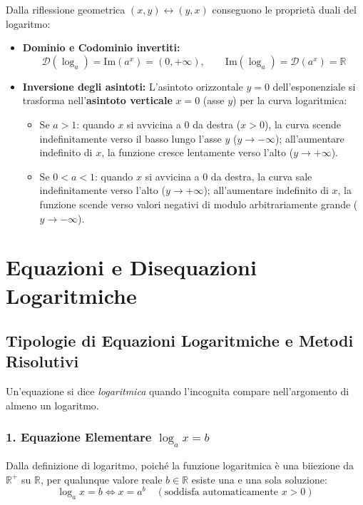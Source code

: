 \documentclass[11pt,a4paper,oneside]{report}
\begin{document}
Dalla riflessione geometrica $(x, y) \longleftrightarrow (y, x)$ conseguono le proprietà duali del logaritmo:
\begin{itemize}
    \item \textbf{Dominio e Codominio invertiti:}
    \begin{equation}
        \mathcal{D}(\log_a) = \mathrm{Im}(a^x) = (0, +\infty), \qquad \mathrm{Im}(\log_a) = \mathcal{D}(a^x) = \mathbb{R}
    \end{equation}
    \item \textbf{Inversione degli asintoti:} L'asintoto orizzontale $y = 0$ dell'esponenziale si trasforma nell'\textbf{asintoto verticale} $x = 0$ (asse $y$) per la curva logaritmica:
    \begin{itemize}
        \item Se $a > 1$: quando $x$ si avvicina a $0$ da destra ($x > 0$), la curva scende indefinitamente verso il basso lungo l'asse $y$ ($y \to -\infty$); all'aumentare indefinito di $x$, la funzione cresce lentamente verso l'alto ($y \to +\infty$).
        \item Se $0 < a < 1$: quando $x$ si avvicina a $0$ da destra, la curva sale indefinitamente verso l'alto ($y \to +\infty$); all'aumentare indefinito di $x$, la funzione scende verso valori negativi di modulo arbitrariamente grande ($y \to -\infty$).
    \end{itemize}
\end{itemize}

\newpage

\chapter{Equazioni e Disequazioni Logaritmiche}

\section{Tipologie di Equazioni Logaritmiche e Metodi Risolutivi}
Un'equazione si dice \emph{logaritmica} quando l'incognita compare nell'argomento di almeno un logaritmo.

\subsection{1. Equazione Elementare \texorpdfstring{$\log_a x = b$}{log\_a x = b}}
Dalla definizione di logaritmo, poiché la funzione logaritmica è una biiezione da $\mathbb{R}^+$ su $\mathbb{R}$, per qualunque valore reale $b \in \mathbb{R}$ esiste una e una sola soluzione:
\begin{equation}
    \log_a x = b \iff x = a^b \quad (\text{soddisfa automaticamente } x > 0)
\end{equation}
\end{document}
